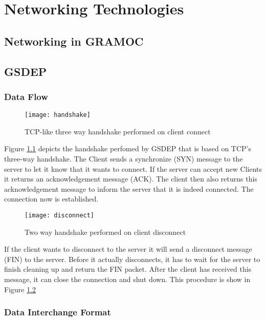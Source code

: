 \chapter{Networking Technologies}
\label{ch:networkingtechnologies}

\section{Networking in GRAMOC}

\section{GSDEP}

\subsection{Data Flow}

\begin{figure}[H]
	\centering
	\texttt{[image: handshake]}
	\caption{TCP-like three way handshake performed on client connect}
	\label{fig:handshake}
\end{figure}

Figure \ref{fig:handshake} depicts the handshake perfomed by GSDEP that is based on TCP's three-way handshake. The Client sends a synchronize (SYN) message to the server to let it know that it wants to connect. If the server can accept new Clients it returns an acknowledgement message (ACK). The client then also returns this acknowledgement message to inform the server that it is indeed connected. The connection now is established.

\begin{figure}[H]
	\centering
	\texttt{[image: disconnect]}
	\caption{Two way handshake performed on client disconnect}
	\label{fig:disconnect}
\end{figure}

If the client wants to disconnect to the server it will send a disconnect message (FIN) to the server. Before it actually disconnects, it has to wait for the server to finish cleaning up and return the FIN packet. After the client has received this message, it can close the connection and shut down. This procedure is show in Figure \ref{fig:disconnect}

\subsection{Data Interchange Format}

